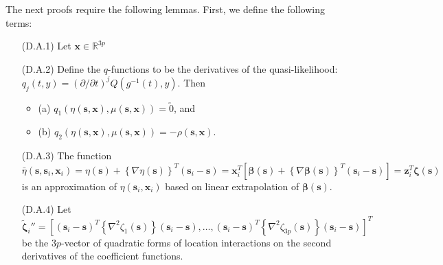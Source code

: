 \documentclass[authoryear,review, 12pt]{elsarticle}
\begin{document}
The next proofs require the following lemmas. First, we define the
following terms:
\begin{itemize}
\item[(D.A.1)] Let $\bm{x}\in\mathbb{R}^{3p}$
\item[(D.A.2)] Define the $q$-functions to be the derivatives of the quasi-likelihood:
$q_{j}(t,y)=\left(\partial/\partial t\right)^{j}Q\left(g^{-1}\left(t\right),y\right)$.
Then

\begin{itemize}
\item (a) $q_{1}\left(\eta\left(\bm{s},\bm{x}\right),\mu\left(\bm{s},\bm{x}\right)\right)=\utilde{0}$,
and 
\item (b) $q_{2}\left(\eta\left(\bm{s},\bm{x}\right),\mu\left(\bm{s},\bm{x}\right)\right)=-\rho\left(\bm{s},\bm{x}\right)$.
\end{itemize}
\item[(D.A.3)] The function $\bar{\eta}\left(\bm{s},\bm{s}_{i},\bm{x}_{i}\right)=\eta\left(\bm{s}\right)+\left\{ \nabla\eta\left(\bm{s}\right)\right\} ^{T}\left(\bm{s}_{i}-\bm{s}\right)=\bm{x}_{i}^{T}\left[\bm{\beta}\left(\bm{s}\right)+\left\{ \nabla\bm{\beta}\left(\bm{s}\right)\right\} ^{T}\left(\bm{s}_{i}-\bm{s}\right)\right]=\bm{z}_{i}^{T}\bm{\zeta}\left(\bm{s}\right)$
is an approximation of $\eta\left(\bm{s}_{i},\bm{x}_{i}\right)$ based
on linear extrapolation of $\bm{\beta}\left(\bm{s}\right)$.
\item[(D.A.4)] Let $\tilde{\bm{\zeta}}_{i}''=\left[\left(\bm{s}_{i}-\bm{s}\right)^{T}\left\{ \nabla^{2}\zeta_{1}\left(\bm{s}\right)\right\} \left(\bm{s}_{i}-\bm{s}\right),\dots,\left(\bm{s}_{i}-\bm{s}\right)^{T}\left\{ \nabla^{2}\zeta_{3p}\left(\bm{s}\right)\right\} \left(\bm{s}_{i}-\bm{s}\right)\right]^{T}$
be the $3p$-vector of quadratic forms of location interactions on
the second derivatives of the coefficient functions.\end{itemize}
\end{document}
